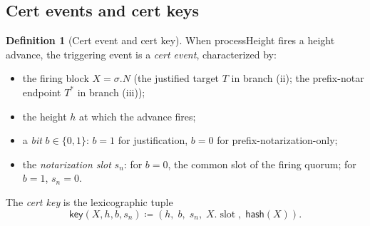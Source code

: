 \documentclass{article}
\newcommand{\slot}{\operatorname{\mathrm{slot}}}
\newcommand{\hash}{\mathsf{hash}}
\newcommand{\key}{\mathsf{key}}
\newcommand{\processHeight}{\textsf{processHeight}\xspace}
\theoremstyle{plain}
\theoremstyle{definition}
\newtheorem{definition}[theorem]{Definition}
\theoremstyle{remark}
\begin{document}
\subsection{Cert events and cert keys}

\begin{definition}[Cert event and cert key]\label{def:cert-event}
When \processHeight fires a height advance, the triggering event is a \emph{cert event}, characterized by:
\begin{itemize}
  \item the firing block $X = \sigma.N$ (the justified target $T$ in branch (ii); the prefix-notar endpoint $T^*$ in branch (iii));
  \item the height $h$ at which the advance fires;
  \item a \emph{bit} $b \in \{0, 1\}$: $b = 1$ for justification, $b = 0$ for prefix-notarization-only;
  \item the \emph{notarization slot} $s_n$: for $b = 0$, the common slot of the firing quorum; for $b = 1$, $s_n = 0$.
\end{itemize}
The \emph{cert key} is the lexicographic tuple
\[
  \key(X, h, b, s_n) \coloneqq (h,\; b,\; s_n,\; X.\slot,\; \hash(X)).
\]
\end{definition}
\end{document}
